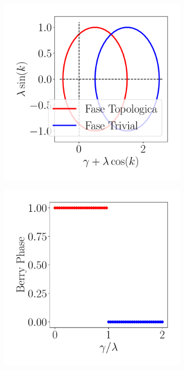 \begin{figure}[tbh!]
\begin{subfigure}[b!]{0.25 \textwidth}
     \end{subfigure}\hspace*{-0.9em}
     \begin{subfigure}[b!]{0.25 \textwidth}
         \caption{}
         \includegraphics[width=\textwidth]{Imagenes/Shh_images/loop_shh.pdf}
     \end{subfigure}\hspace*{-0.9em}
     \begin{subfigure}[b!]{0.25 \textwidth}
         \caption{}
         \includegraphics[width=\textwidth]{Imagenes/Shh_images/winding_shh.pdf}

\end{subfigure}
\end{figure}
